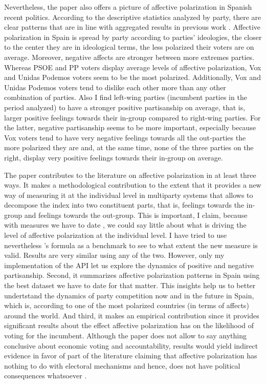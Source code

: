 \documentclass[a4paper, svgnames]{article}
\newcommand{\citeposs}[1]{\citeauthor{#1}'s \citeyearpar{#1}}
\begin{document}
Nevertheless, the paper also offers a picture of affective polarization in Spanish recent politics. According to the descriptive statistics analyzed by party, there are clear patterns that are in line with aggregated results in previous work \citep*{Orriols2020, Orriols2021}. Affective polarization in Spain is spread by party according to parties' ideologies, the closer to the center they are in ideological terms, the less polarized their voters are on average. Moreover, negative affects are stronger between more extremes parties. Whereas PSOE and PP voters display average levels of affective polarization, Vox and Unidas Podemos voters seem to be the most polarized. Additionally, Vox and Unidas Podemos voters tend to dislike each other more than any other combination of parties. Also I find left-wing parties (incumbent parties in the period analyzed) to have a stronger positive partisanship on average, that is, larger positive feelings towards their in-group compared to right-wing parties. For the latter, negative partisanship seems to be more important, especially because Vox voters tend to have very negative feelings towards all the out-parties the more polarized they are and, at the same time, none of the three parties on the right, display very positive feelings towards their in-group on average. 

The paper contributes to the literature on affective polarization in at least three ways. It makes a methodological contribution to the extent that it provides a new way of measuring it at the individual level in multiparty systems that allows to decompose the index into two constituent parts, that is, feelings towards the in-group and feelings towards the out-group. This is important, I claim, because with measures we have to date \citep*{Wagner2021}, we could say little about what is driving the level of affective polarization at the individual level. I have tried to use nevertheless \citeposs{Wagner2021} formula as a benchmark to see to what extent the new measure is valid. Results are very similar using any of the two. However, only my implementation of the API let us explore the dynamics of positive and negative partisanship.
Second, it summarizes affective polarization patterns in Spain using the best dataset we have to date for that matter. This insights help us to better undertstand the dynamics of party competition now and in the future in Spain, which is, according to \citet*{Gidron2018} one of the most polarized countries (in terms of affects) around the world. And third, it makes an empirical contribution since it provides significant results about the effect affective polarization has on the likelihood of voting for the incumbent. Although the paper does not allow to say anything conclusive about economic voting and accountability, results would yield indirect evidence in favor of part of the literature claiming that affective polarization has nothing to do with electoral mechanisms and hence, does not have political consequences whatsoever \citep*{broockmanDoesAffectivePolarization2020}. 
\end{document}
